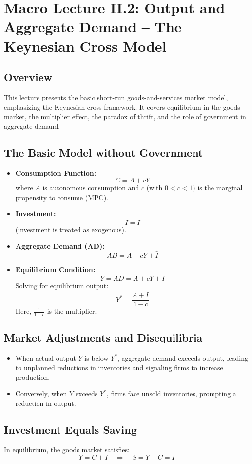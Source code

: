 \chapter*{Macro Lecture II.2: Output and Aggregate Demand -- The Keynesian Cross Model}
\section*{Overview}
This lecture presents the basic short-run goods-and-services market model, emphasizing the Keynesian cross framework. It covers equilibrium in the goods market, the multiplier effect, the paradox of thrift, and the role of government in aggregate demand.

\section*{The Basic Model without Government}
\begin{itemize}
    \item \textbf{Consumption Function:}
    \[
    C = A + cY
    \]
    where \(A\) is autonomous consumption and \(c\) (with \(0 < c < 1\)) is the marginal propensity to consume (MPC).
    \item \textbf{Investment:}
    \[
    I = \bar{I}
    \]
    (investment is treated as exogenous).
    \item \textbf{Aggregate Demand (AD):}
    \[
    AD = A + cY + \bar{I}
    \]
    \item \textbf{Equilibrium Condition:}
    \[
    Y = AD = A + cY + \bar{I}
    \]
    Solving for equilibrium output:
    \[
    Y^* = \frac{A + \bar{I}}{1 - c}
    \]
    Here, \(\frac{1}{1-c}\) is the multiplier.
\end{itemize}

\section*{Market Adjustments and Disequilibria}
\begin{itemize}
    \item When actual output \(Y\) is below \(Y^*\), aggregate demand exceeds output, leading to unplanned reductions in inventories and signaling firms to increase production.
    \item Conversely, when \(Y\) exceeds \(Y^*\), firms face unsold inventories, prompting a reduction in output.
\end{itemize}

\section*{Investment Equals Saving}
In equilibrium, the goods market satisfies:
\[
Y = C + I \quad \Rightarrow \quad S = Y - C = I
\]

